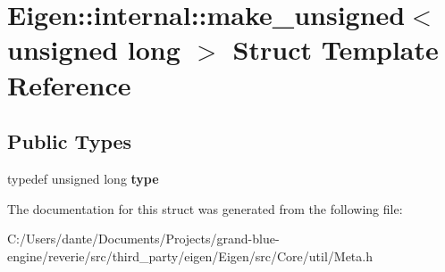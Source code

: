 \hypertarget{struct_eigen_1_1internal_1_1make__unsigned_3_01unsigned_01long_01_4}{}\section{Eigen\+::internal\+::make\+\_\+unsigned$<$ unsigned long $>$ Struct Template Reference}
\label{struct_eigen_1_1internal_1_1make__unsigned_3_01unsigned_01long_01_4}
\subsection*{Public Types}
\begin{DoxyCompactItemize}
\item 
\mbox{\label{struct_eigen_1_1internal_1_1make__unsigned_3_01unsigned_01long_01_4_a5a3bb33905efa2f238c0d13296d8f740}} 
typedef unsigned long {\bfseries type}
\end{DoxyCompactItemize}


The documentation for this struct was generated from the following file\+:\begin{DoxyCompactItemize}
\item 
C\+:/\+Users/dante/\+Documents/\+Projects/grand-\/blue-\/engine/reverie/src/third\+\_\+party/eigen/\+Eigen/src/\+Core/util/Meta.\+h\end{DoxyCompactItemize}
